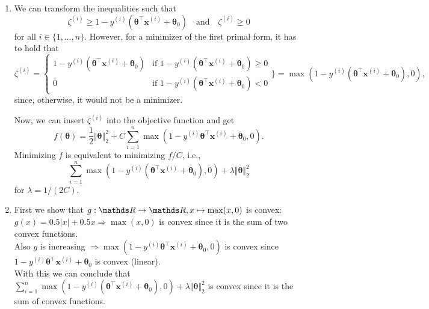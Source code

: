\documentclass[a4paper]{article}
\begin{document}
{\begin{enumerate}
\item We can transform the inequalities such that
    $$\zeta^{(i)} \geq 1 - y^{(i)}\left( \bm{\theta}^\top\mathbf{x}^{(i)} + \bm{\theta}_0\right) \quad\text{and}\quad \zeta^{(i)} \geq 0$$
  for all $i \in \{1,\dots,n\}$.
  However, for a minimizer of the first primal form, it has to hold that
    $$\zeta^{(i)} = \begin{cases} 1 - y^{(i)}\left( \bm{\theta}^\top\mathbf{x}^{(i)} + \bm{\theta}_0\right) & \text{if } 1 - y^{(i)}\left( \bm{\theta}^\top\mathbf{x}^{(i)} + \bm{\theta}_0\right) \geq 0 \\
    0 & \text{if } 1 - y^{(i)}\left( \bm{\theta}^\top\mathbf{x}^{(i)} + \bm{\theta}_0\right) < 0
    \end{cases} \Biggr\} = \max(1 - y^{(i)}\left( \bm{\theta}^\top\mathbf{x}^{(i)} + \bm{\theta}_0\right), 0),$$
  since, otherwise, it would not be a minimizer.

  Now, we can insert $\zeta^{(i)}$ into the objective function and get $$f(\bm{\theta}) =
  \frac{1}{2}\Vert\bm{\theta}\Vert^2_2 + C\sum^n_{i=1}\max(1-y^{(i)}\bm{\theta}^\top\mathbf{x}^{(i)} + \bm{\theta}_0, 0).$$
  Minimizing $f$ is equivalent to minimizing $f/C$, i.e., $$\sum^n_{i=1}\max(1-y^{(i)}(\bm{\theta}^\top\mathbf{x}^{(i)} + \bm{\theta}_0), 0) + \lambda\Vert\bm{\theta}\Vert^2_2$$ for $\lambda = 1/(2C).$

\item First we show that $g:\R \rightarrow \R, x \mapsto \max(x, 0)$ is convex: \\
$g(x) = 0.5\vert x \vert + 0.5x \Rightarrow \max(x, 0)$ is convex since it is the sum of two convex functions. \\
Also $g$ is increasing $\Rightarrow \max(1-y^{(i)}\bm{\theta}^\top\mathbf{x}^{(i)} + \bm{\theta}_0, 0)$ is convex since $1-y^{(i)}\bm{\theta}^\top\mathbf{x}^{(i)} + \bm{\theta}_0$ is convex (linear). \\
With this we can conclude that $\sum^n_{i=1}\max(1-y^{(i)}(\bm{\theta}^\top\mathbf{x}^{(i)} + \bm{\theta}_0), 0) + \lambda\Vert\bm{\theta}\Vert^2_2$ is convex since it is the sum of convex functions.

\end{enumerate}
}
\end{document}
